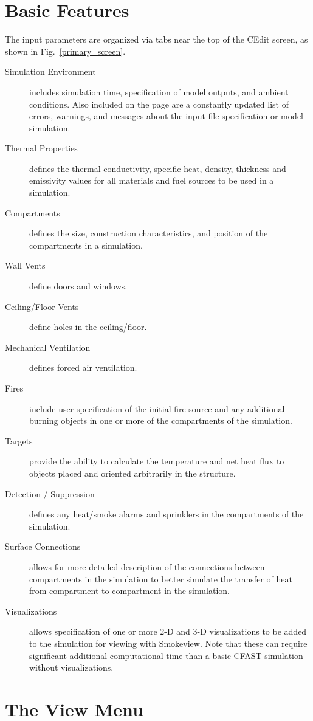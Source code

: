 \section{Basic Features}

The input parameters are organized via tabs near the top of the CEdit screen, as shown in Fig.~\ref{primary_screen}.
\begin{description}
\item[Simulation Environment] includes simulation time, specification of model outputs, and ambient conditions. Also included on the page are a constantly updated list of errors, warnings, and messages about the input file specification or model simulation.
\item[Thermal Properties] defines the thermal conductivity, specific heat, density, thickness and emissivity values for all materials and fuel sources to be used in a simulation.
\item[Compartments] defines the size, construction characteristics, and position of the compartments in a simulation.
\item[Wall Vents] define doors and windows.
\item[Ceiling/Floor Vents] define holes in the ceiling/floor.
\item[Mechanical Ventilation] defines forced air ventilation.
\item[Fires] include user specification of the initial fire source and any additional burning objects in one or more of the compartments of the simulation.
\item[Targets] provide the ability to calculate the temperature and net heat flux to objects placed and oriented arbitrarily in the structure.
\item[Detection / Suppression] defines any heat/smoke alarms and sprinklers in the compartments of the simulation.
\item[Surface Connections] allows for more detailed description of the connections between compartments in the simulation to better simulate the transfer of heat from compartment to compartment in the simulation.
\item[Visualizations] allows specification of one or more 2-D and 3-D visualizations to be added to the simulation for viewing with Smokeview. Note that these can require significant additional computational time than a basic CFAST simulation without visualizations.
\end{description}


\section{The View Menu}

